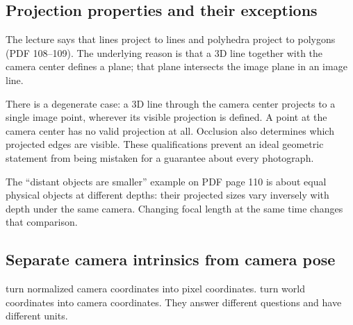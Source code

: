 \documentclass[letterpaper,11pt,english,openany,oneside]{jupyterBook}
\begin{document}
\subsection{Projection properties and their exceptions}
\label{\detokenize{lectures/lecture01/cameras:projection-properties-and-their-exceptions}}
\sphinxAtStartPar
The lecture says that lines project to lines and polyhedra project to polygons (PDF 108–109). The underlying reason is that a 3D line together with the camera center defines a plane; that plane intersects the image plane in an image line.

\sphinxAtStartPar
There is a degenerate case: a 3D line through the camera center projects to a single image point, wherever its visible projection is defined. A point at the camera center has no valid projection at all. Occlusion also determines which projected edges are visible. These qualifications prevent an ideal geometric statement from being mistaken for a guarantee about every photograph.

\sphinxAtStartPar
The “distant objects are smaller” example on PDF page 110 is about equal physical objects at different depths: their projected sizes vary inversely with depth under the same camera. Changing focal length at the same time changes that comparison.


\subsection{Separate camera intrinsics from camera pose}
\label{\detokenize{lectures/lecture01/cameras:separate-camera-intrinsics-from-camera-pose}}
\sphinxAtStartPar
{} turn normalized camera coordinates into pixel coordinates.  turn world coordinates into camera coordinates. They answer different questions and have different units.
\end{document}
